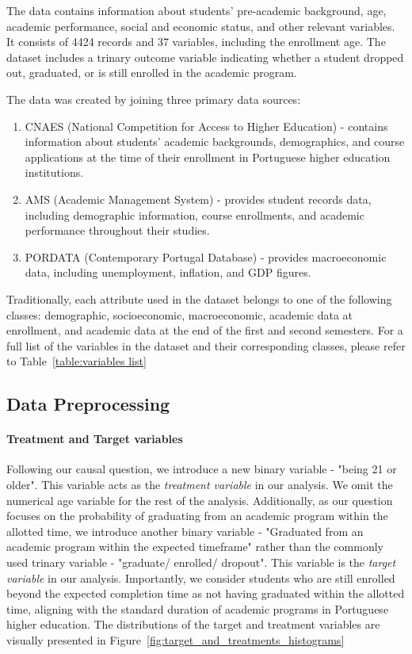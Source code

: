 \documentclass{article}
\begin{document}
The data contains information about students' pre-academic background, age, academic performance, social and economic status, and other relevant variables. It consists of 4424 records and 37 variables, including the enrollment age. The dataset includes a trinary outcome variable indicating whether a student dropped out, graduated, or is still enrolled in the academic program. 

The data was created by joining three primary data sources: 
\begin{enumerate}
    \item CNAES (National Competition for Access to Higher Education) - contains information about students' academic backgrounds, demographics, and course applications at the time of their enrollment in Portuguese higher education institutions.
    \item AMS (Academic Management System) - provides student records data, including demographic information, course enrollments, and academic performance throughout their studies.
    \item PORDATA (Contemporary Portugal Database) - provides macroeconomic data, including unemployment, inflation, and GDP figures.
\end{enumerate}

Traditionally, each attribute used in the dataset belongs to one of the following classes: demographic,
socioeconomic, macroeconomic, academic data at enrollment, and academic data at the end of the first and second semesters. For a full list of the variables in the dataset and their corresponding classes, please refer to Table~\ref{table:variables list}

\subsection{Data Preprocessing}

\paragraph{Treatment and Target variables} Following our causal question, we introduce a new binary variable - "being 21 or older". This variable acts as the \emph{treatment variable} in our analysis. We omit the numerical age variable for the rest of the analysis. Additionally, as our question focuses on the probability of graduating from an academic program within the allotted time, we introduce another binary variable - "Graduated from an academic program within the expected timeframe" rather than the commonly used trinary variable - "graduate/ enrolled/ dropout". This variable is the \emph{target variable} in our analysis. Importantly, we consider students who are still enrolled beyond the expected completion time as not having graduated within the allotted time, aligning with the standard duration of academic programs in Portuguese higher education. The distributions of the target and treatment variables are visually presented in Figure~\ref{fig:target_and_treatments_histograms}
\end{document}
